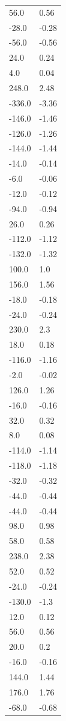 \begin{longtable}{ll}
56.0 & 0.56 \\
-28.0 & -0.28 \\
-56.0 & -0.56 \\
24.0 & 0.24 \\
4.0 & 0.04 \\
248.0 & 2.48 \\
-336.0 & -3.36 \\
-146.0 & -1.46 \\
-126.0 & -1.26 \\
-144.0 & -1.44 \\
-14.0 & -0.14 \\
-6.0 & -0.06 \\
-12.0 & -0.12 \\
-94.0 & -0.94 \\
26.0 & 0.26 \\
-112.0 & -1.12 \\
-132.0 & -1.32 \\
100.0 & 1.0 \\
156.0 & 1.56 \\
-18.0 & -0.18 \\
-24.0 & -0.24 \\
230.0 & 2.3 \\
18.0 & 0.18 \\
-116.0 & -1.16 \\
-2.0 & -0.02 \\
126.0 & 1.26 \\
-16.0 & -0.16 \\
32.0 & 0.32 \\
8.0 & 0.08 \\
-114.0 & -1.14 \\
-118.0 & -1.18 \\
-32.0 & -0.32 \\
-44.0 & -0.44 \\
-44.0 & -0.44 \\
98.0 & 0.98 \\
58.0 & 0.58 \\
238.0 & 2.38 \\
52.0 & 0.52 \\
-24.0 & -0.24 \\
-130.0 & -1.3 \\
12.0 & 0.12 \\
56.0 & 0.56 \\
20.0 & 0.2 \\
-16.0 & -0.16 \\
144.0 & 1.44 \\
176.0 & 1.76 \\
-68.0 & -0.68 \\

\end{longtable}
